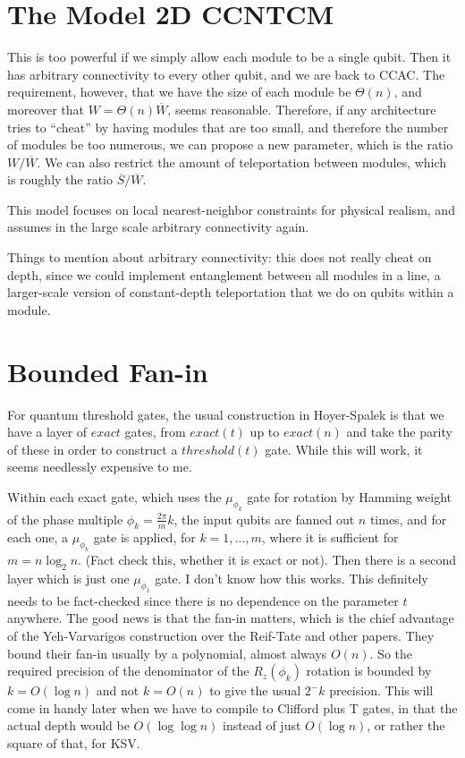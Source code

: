 \documentclass{article}
\begin{document}
\section{The Model 2D CCNTCM}

This is too powerful if we simply allow each module to be a single
qubit. Then it has arbitrary connectivity to every other qubit,
and we are back to CCAC. The requirement, however, that we have
the size of each module be $\Theta(n)$,
and moreover that $W = \Theta(n)\overline{W}$,
seems reasonable. Therefore, if any architecture tries to ``cheat'' by
having modules that are too small, and therefore the number of modules
be too numerous, we can propose a new parameter, which is the ratio
$W / \overline{W}$. We can also restrict the amount of teleportation
between modules, which is roughly the ratio $\overline{S} / \overline{W}$.

This model focuses on local nearest-neighbor constraints for physical
realism, and assumes in the large scale arbitrary connectivity again.

Things to mention about arbitrary connectivity: this does not really
cheat on depth, since we could implement entanglement between
all modules in a line, a larger-scale version of constant-depth
teleportation that we do on qubits within a module.

\section{Bounded Fan-in}

For quantum threshold gates, the usual construction in Hoyer-Spalek is
that we have a layer of $exact$ gates, from $exact(t)$ up to $exact(n)$
and take the parity of these in order to construct a
$threshold(t)$ gate. While this will work, it seems needlessly expensive
to me.

Within each exact gate, which uses the $\mu_{\phi_k}$ gate for
rotation by Hamming weight of the phase multiple $\phi_k = \frac{2\pi}{m}k$,
the input qubits are fanned out $n$ times, and for each one,
a $\mu_{\phi_k}$ gate is applied, for $k=1,\ldots, m$, where it is
sufficient for $m = n\log_2 n$. (Fact check this, whether it is
exact or not). Then there is a second layer which is just one
$\mu_{\phi_1}$ gate. I don't know how this works. This definitely needs
to be fact-checked since there is no dependence on the parameter $t$
anywhere. The good news is that the fan-in matters, which is the chief
advantage of the Yeh-Varvarigos construction over the Reif-Tate and
other papers. They bound their fan-in usually by a polynomial,
almost always $O(n)$. So the required precision of the denominator of
the
$R_z(\phi_k)$ rotation is bounded by $k = O(\log n)$ and not
$k = O(n)$ to give the usual $2^-k$ precision. This will come in handy
later when we have to compile to Clifford plus T gates, in that the
actual depth would be $O(\log \log n)$ instead of just $O(\log n)$,
or rather the square of that, for KSV.
\end{document}
